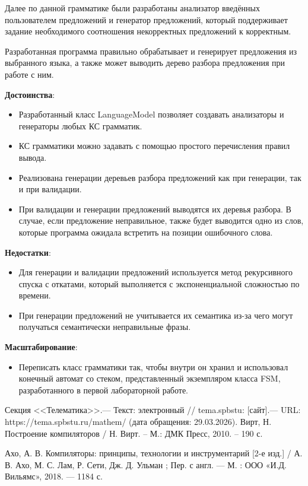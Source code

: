 \documentclass[a4paper,final]{article}
\begin{document}
Далее по данной грамматике были разработаны анализатор введённых пользователем предложений и генератор предложений, который поддерживает задание необходимого соотношения некорректных предложений к корректным.

Разработанная программа правильно обрабатывает и генерирует предложения из выбранного языка, а также может выводить дерево разбора предложения при работе с ним.

\textbf{Достоинства}:
\begin{itemize}
    \item Разработанный класс LanguageModel позволяет создавать анализаторы и генераторы любых КС грамматик.
    \item КС грамматики можно задавать с помощью простого перечисления правил вывода.
    \item Реализована генерации деревьев разбора предложений как при генерации, так и при валидации.
    \item При валидации и генерации предложений выводятся их деревья разбора. В случае, если предложение неправильное, также будет выводится одно из слов, которые программа ожидала встретить на позиции ошибочного слова.
\end{itemize}

\textbf{Недостатки}:
\begin{itemize}
    \item Для генерации и валидации предложений используется метод рекурсивного спуска с откатами, который выполняется с экспоненциальной сложностью по времени.
    \item При генерации предложений не учитывается их семантика из-за чего могут получаться семантически неправильные фразы.
\end{itemize}

\textbf{Масштабирование}:
\begin{itemize}
    \item Переписать класс грамматики так, чтобы внутри он хранил и использовал конечный автомат со стеком, представленный экземпляром класса FSM, разработанного в первой лабораторной работе.
\end{itemize}

\newpage
{}
\begin{thebibliography}{}
     Секция <<Телематика>>.— Текст: электронный // tema.spbstu: [сайт].— URL: https://tema.spbstu.ru/mathem/ (дата обращения: 29.03.2026).
     Вирт, Н. Построение компиляторов / Н. Вирт. – М.: ДМК Пресс, 2010. – 190 с.

     Ахо, А. В. Компиляторы: принципы, технологии и инструментарий [2-е изд.] / А. В. Ахо, М. С. Лам, Р. Сети, Дж. Д. Ульман ; Пер. с англ. — М. : ООО «И.Д. Вильямс», 2018. — 1184 с.
\end{thebibliography}
\end{document}
